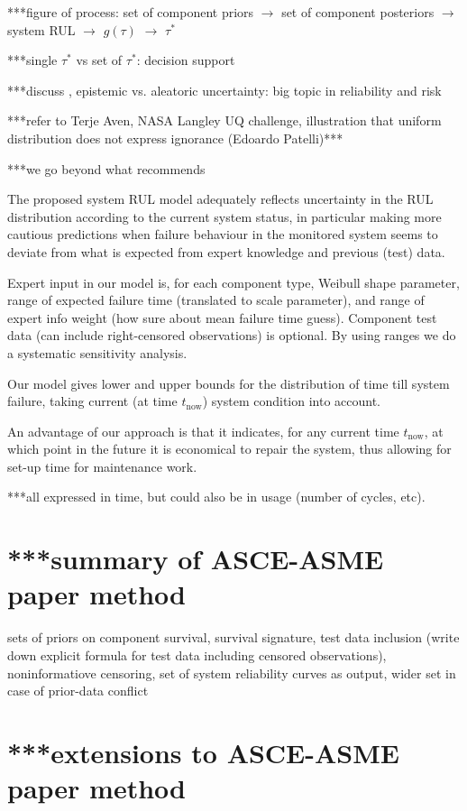 \documentclass[authoryear]{elsarticle}
\def\tnow{t_\text{now}}
\begin{document}
***figure of process: set of component priors $\to$ set of component posteriors $\to$ system RUL $\to$ $g(\tau)$ $\to$ $\tau^*$

***single $\tau^*$ vs set of $\tau^*$: decision support

***discuss \cite{2015:sankararaman}, epistemic vs. aleatoric uncertainty: big topic in reliability and risk

***refer to Terje Aven, NASA Langley UQ challenge, illustration that uniform distribution does not express ignorance (Edoardo Patelli)***

***we go beyond what \cite{2015:sankararaman} recommends

The proposed system RUL model adequately reflects uncertainty in the RUL distribution
according to the current system status,
in particular making more cautious predictions when failure behaviour in the monitored system
seems to deviate from what is expected from expert knowledge and previous (test) data.

Expert input in our model is, for each component type,
Weibull shape parameter, range of expected failure time (translated to scale parameter),
and range of expert info weight (how sure about mean failure time guess).
Component test data (can include right-censored observations) is optional.
By using ranges we do a systematic sensitivity analysis.

Our model gives lower and upper bounds for the distribution of time till system failure,
taking current (at time $\tnow$) system condition into account.

An advantage of our approach is that
it indicates, for any current time $\tnow$, at which point in the future it is economical to repair the system,
thus allowing for set-up time for maintenance work.

***all expressed in time, but could also be in usage (number of cycles, etc).

\section{***summary of ASCE-ASME paper method}

sets of priors on component survival,
survival signature,
test data inclusion
(write down explicit formula for test data including censored observations),
noninformatiove censoring,
set of system reliability curves as output,
wider set in case of prior-data conflict

\section{***extensions to ASCE-ASME paper method}
\label{sec:extensions}
\end{document}
